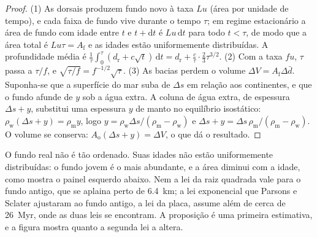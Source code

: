 \begin{proof}
(1) As dorsais produzem fundo novo à taxa $Lu$ (área por unidade de tempo), e cada faixa de fundo vive
durante o tempo $\tau$; em regime estacionário a área de fundo com idade entre $t$ e $t + \mathrm{d}t$
é $Lu\,\mathrm{d}t$ para todo $t < \tau$, de modo que a área total é $Lu\tau = A_{\text{f}}$ e as
idades estão uniformemente distribuídas. A profundidade média é
$\frac1\tau\int_0^\tau (d_{\text{r}} + c\sqrt t)\,\mathrm{d}t = d_{\text{r}} + \frac{c}{\tau}
\cdot\frac23\tau^{3/2}$. (2) Com a taxa $fu$, $\tau$ passa a $\tau/f$, e
$\sqrt{\tau/f} = f^{-1/2}\sqrt\tau$. (3) As bacias perdem o volume $\Delta V = A_{\text{f}}
\Delta\bar d$. Suponha-se que a superfície do mar suba de $\Delta s$ em relação aos continentes, e que o fundo afunde
de $y$ sob a água extra. A coluna de água extra, de espessura $\Delta s + y$, substitui uma
espessura $y$ de manto no equilíbrio isostático: $\rho_{\text{w}}(\Delta s + y) =
\rho_{\text{m}} y$, logo $y = \rho_{\text{w}}\Delta s/(\rho_{\text{m}} - \rho_{\text{w}})$ e
$\Delta s + y = \Delta s\,\rho_{\text{m}}/(\rho_{\text{m}} - \rho_{\text{w}})$. O volume se
conserva: $A_{\text{o}}(\Delta s + y) = \Delta V$, o que dá o resultado.
\end{proof}

O fundo real não é tão ordenado. Suas idades não estão uniformemente distribuídas: o fundo jovem é o mais abundante,
e a área diminui com a idade, como mostra o painel esquerdo abaixo. Nem a lei da raiz quadrada vale para o
fundo antigo, que se aplaina perto de \qty{6.4}{km}; a lei exponencial que Parsons e Sclater
ajustaram ao fundo antigo, a lei da placa, assume além de cerca de \qty{26}{Myr}, onde as duas leis
se encontram. A proposição é uma primeira estimativa, e a figura
mostra quanto a segunda lei a altera.

